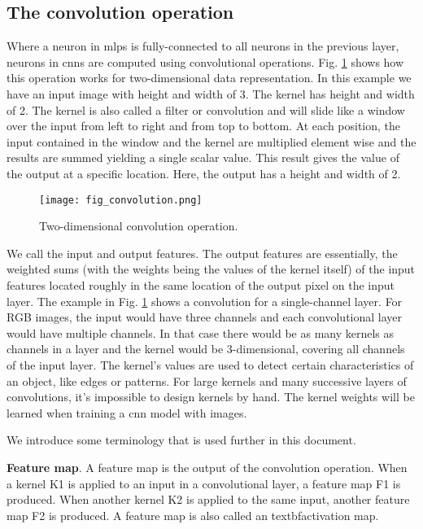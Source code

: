 \subsection{The convolution operation}
Where a neuron in \acrshort{mlp}s is fully-connected to all neurons in the previous layer, neurons in \acrshort{cnn}s are computed using convolutional operations. Fig. \ref{fig:convolution} shows how this operation works for two-dimensional data representation. In this example we have an input image with height and width of 3. The kernel has height and width of 2. The kernel is also called a filter or convolution and will slide like a window over the input from left to right and from top to bottom. At each position, the input contained in the window and the kernel are multiplied element wise and the results are summed yielding a single scalar value. This result gives the value of the output at a specific location. Here, the output has a height and width of 2.
\begin{figure}[ht]
    \begin{center}       
    \texttt{[image: fig\_convolution.png]}
    \caption{Two-dimensional convolution operation.}
    \label{fig:convolution}
    \end{center}
\end{figure}

We call the input and output features. The output features are essentially, the weighted sums (with the weights being the values of the kernel itself) of the input features located roughly in the same location of the output pixel on the input layer. The example in Fig. \ref{fig:convolution} shows a convolution for a single-channel layer. For RGB images, the input would have three channels and each convolutional layer would have multiple channels. In that case there would be as many kernels as channels in a layer and the kernel would be 3-dimensional, covering all channels of the input layer. The kernel's values are used to detect certain characteristics of an object, like edges or patterns. For large kernels and many successive layers of convolutions, it's impossible to design kernels by hand. The kernel weights will be learned when training a \acrshort{cnn} model with images.

We introduce some terminology that is used further in this document.

\textbf{Feature map}. A feature map is the output of the convolution operation. When a kernel K1 is applied to an input in a convolutional layer, a feature map F1 is produced. When another kernel K2 is applied to the same input, another feature map F2 is produced. A feature map is also called an textbf{activation map}.

